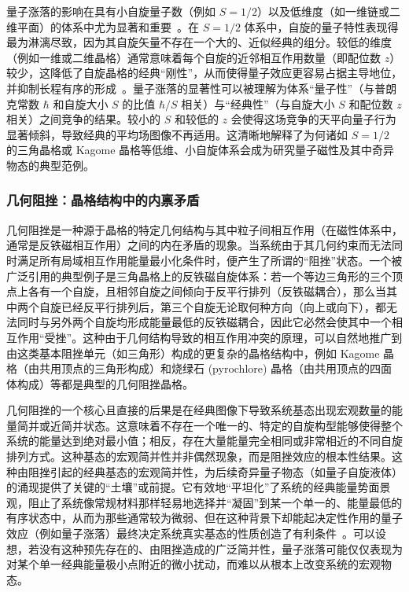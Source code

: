 量子涨落的影响在具有小自旋量子数（例如 $S=1/2$）以及低维度（如一维链或二维平面）的体系中尤为显著和重要~\cite{bairwa2025Quantum}。在 $S=1/2$ 体系中，自旋的量子特性表现得最为淋漓尽致，因为其自旋矢量不存在一个大的、近似经典的组分。较低的维度（例如一维或二维晶格）通常意味着每个自旋的近邻相互作用数量（即配位数 $z$）较少，这降低了自旋晶格的经典“刚性”，从而使得量子效应更容易占据主导地位，并抑制长程有序的形成~\cite{alexanian2025Threedimensional}。量子涨落的显著性可以被理解为体系“量子性”（与普朗克常数 $\hbar$ 和自旋大小 $S$ 的比值 $\hbar/S$ 相关）与“经典性”（与自旋大小 $S$ 和配位数 $z$ 相关）之间竞争的结果。较小的 $S$ 和较低的 $z$ 会使得这场竞争的天平向量子行为显著倾斜，导致经典的平均场图像不再适用。这清晰地解释了为何诸如 $S=1/2$ 的三角晶格或 Kagome 晶格等低维、小自旋体系会成为研究量子磁性及其中奇异物态的典型范例。

\subsubsection{几何阻挫：晶格结构中的内禀矛盾}

几何阻挫是一种源于晶格的特定几何结构与其中粒子间相互作用（在磁性体系中，通常是反铁磁相互作用）之间的内在矛盾的现象。当系统由于其几何约束而无法同时满足所有局域相互作用能量最小化条件时，便产生了所谓的“阻挫”状态。一个被广泛引用的典型例子是三角晶格上的反铁磁自旋体系：若一个等边三角形的三个顶点上各有一个自旋，且相邻自旋之间倾向于反平行排列（反铁磁耦合），那么当其中两个自旋已经反平行排列后，第三个自旋无论取何种方向（向上或向下），都无法同时与另外两个自旋均形成能量最低的反铁磁耦合，因此它必然会使其中一个相互作用“受挫”。这种由于几何结构导致的相互作用冲突的原理，可以自然地推广到由这类基本阻挫单元（如三角形）构成的更复杂的晶格结构中，例如 Kagome 晶格（由共用顶点的三角形构成）和烧绿石 (pyrochlore) 晶格（由共用顶点的四面体构成）等都是典型的几何阻挫晶格。

几何阻挫的一个核心且直接的后果是在经典图像下导致系统基态出现宏观数量的能量简并或近简并状态。这意味着不存在一个唯一的、特定的自旋构型能够使得整个系统的能量达到绝对最小值；相反，存在大量能量完全相同或非常相近的不同自旋排列方式。这种基态的宏观简并性并非偶然现象，而是阻挫效应的根本性结果。这种由阻挫引起的经典基态的宏观简并性，为后续奇异量子物态（如量子自旋液体）的涌现提供了关键的“土壤”或前提。它有效地“平坦化”了系统的经典能量势面景观，阻止了系统像常规材料那样轻易地选择并“凝固”到某一个单一的、能量最低的有序状态中，从而为那些通常较为微弱、但在这种背景下却能起决定性作用的量子效应（例如量子涨落）最终决定系统真实基态的性质创造了有利条件~\cite{lacroix2011Introduction}。可以设想，若没有这种预先存在的、由阻挫造成的广泛简并性，量子涨落可能仅仅表现为对某个单一经典能量极小点附近的微小扰动，而难以从根本上改变系统的宏观物态。

